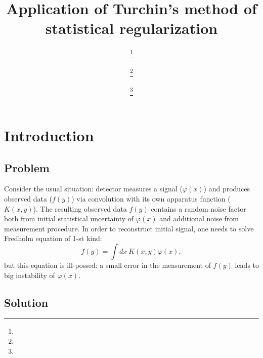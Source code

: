 \documentclass{webofc}
\begin{document}
\title{Application of Turchin's method of statistical regularization}
\author{ \fnsep\thanks{} \and
      \and {} \fnsep\thanks{} \and {} \fnsep\thanks{}  
    }
%
%
\maketitle

\section{Introduction}

\subsection{Problem}

Consider the usual situation: detector measures a signal ($\varphi(x)$) and produces observed data ($f(y)$) via convolution with its own apparatus function ($K(x,y)$). The resulting observed data $f(y)$ contains a random noise factor both from initial statistical uncertainty of $\varphi(x)$ and additional noise from measurement procedure. In order to reconstruct initial signal, one needs to solve Fredholm equation of 1-st kind:
\begin{equation}
\label{eq-01}
    f(y) = \int dx~ K(x,y)\varphi(x),
\end{equation}
but this equation is ill-possed: a small error in the measurement of $f(y)$ leads to big instability of $\varphi(x)$. 

\subsection{Solution}
\end{document}
